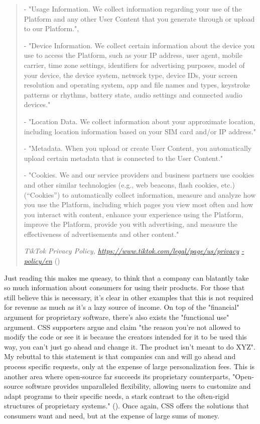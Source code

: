 \documentclass[11pt]{article}
\begin{document}
\begin{quote}
- "Usage Information. We collect information regarding your use of the Platform and any other User Content that you generate through or upload to our Platform.", 

- "Device Information. We collect certain information about the device you use to access the Platform, such as your IP address, user agent, mobile carrier, time zone settings, identifiers for advertising purposes, model of your device, the device system, network type, device IDs, your screen resolution and operating system, app and file names and types, keystroke patterns or rhythms, battery state, audio settings and connected audio devices."

- "Location Data. We collect information about your approximate location, including location information based on your SIM card and/or IP address."

- "Metadata. When you upload or create User Content, you automatically upload certain metadata that is connected to the User Content."

- "Cookies. We and our service providers and business partners use cookies and other similar technologies (e.g., web beacons, flash cookies, etc.) (“Cookies”) to automatically collect information, measure and analyze how you use the Platform, including which pages you view most often and how you interact with content, enhance your experience using the Platform, improve the Platform, provide you with advertising, and measure the effectiveness of advertisements and other content."

\emph{TikTok Privacy Policy, \url{https://www.tiktok.com/legal/page/us/privacy}
\newline
\url{-policy/en}}
(\cite{TikTokPrivacyPolicy})
\end{quote}

Just reading this makes me queasy, to think that a company can blatantly take so much information about consumers for using their products. For those that still believe this is necessary, it's clear in other examples that this is not required for revenue as much as it's a lazy source of income. On top of the "financial" argument for proprietary software, there's also exists the "functional use" argument. CSS supporters argue and claim "the reason you're not allowed to modify the code or see it is because the creators intended for it to be used this way, you can't just go ahead and change it. The product isn't meant to do XYZ". My rebuttal to this statement is that companies can and will go ahead and process specific requests, only at the expense of large personalization fees. This is another area where open-source far succeeds its proprietary counterparts, "Open-source software provides unparalleled flexibility, allowing users to customize and adapt programs to their specific needs, a stark contrast to the often-rigid structures of proprietary systems." (\cite{OpenInnovationComparison}). Once again, CSS offers the solutions that consumers want and need, but at the expense of large sums of money. 
\end{document}

